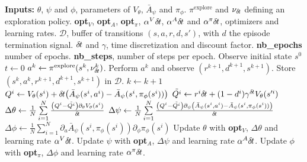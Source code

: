 
\begin{algorithmic}
	\STATE \textbf{Inputs:}
	\STATE $\theta$, $\psi$ and $\phi$, parameters of
	$V_{\theta}$, $\bar{A}_{\psi}$ and $\pi_\phi$.
	\STATE $\pi^{\text{explore}}$ and $\nu_{\delta\hspace{-.1em}t}$ defining an exploration policy.
	\STATE \textbf{opt}$_V$, \textbf{opt}$_A$, \textbf{opt}$_\pi$, $\alpha^V {\delta\hspace{-.1em}t}$, $\alpha^A {\delta\hspace{-.1em}t}$ and $\alpha^\pi{\delta\hspace{-.1em}t}$, optimizers and learning rates.
	\STATE $\mathcal{D}$, buffer of transitions $(s, a, r, d, s')$, with $d$ the episode termination signal.
	\STATE ${\delta\hspace{-.1em}t}$ and $\gamma$, time discretization and discount factor.
	\STATE \textbf{nb\_epochs} number of epochs.
	\STATE \textbf{nb\_steps}, number of steps per epoch.
	\STATE
	\STATE Observe initial state $s^0$
	\STATE $t \gets 0$
	\STATE $a^k \leftarrow \pi^{\text{explore}}(s^k, \nu^k_{\delta\hspace{-.1em}t})$.
	\STATE Perform $a^k$ and observe $(r^{k+1}, d^{k+1}, s^{k+1})$.
	\STATE Store $(s^k, a^k, r^{k+1}, d^{k+1}, s^{k+1})$ in $\mathcal{D}$.
	\STATE $k \gets k + 1$
	\ENDFOR
	\STATE {}
	\STATE $Q^i \gets V_{\theta}(s^i) + {\delta\hspace{-.1em}t}\hspace{-.17em}\left(
	\bar{A}_{\psi}(s^i, a^i) - \bar{A}_{\psi}(s^i, \pi_\phi(s^i))\right)$
	\STATE $\tilde{Q^i} \gets r^i{\delta\hspace{-.1em}t} + (1 - d^i) \gamma^{{\delta\hspace{-.1em}t}} V_{\theta}(s'^i)$
	\STATE $\Delta \theta \gets \frac{1}{N}\sum\limits_{i=1}^N  \frac{\left(Q^i - \tilde{Q^i}\right)\partial_{\theta} V_{\theta}(s^i)}{{\delta\hspace{-.1em}t}}$
	\STATE $\Delta \psi \gets \frac{1}{N}\sum\limits_{i=1}^N \frac{\left(Q^i - \tilde{Q^i}\right)\partial_{\psi} \left(\bar{A}_{\psi}(s^i, a^i) - \bar{A}_{\psi}(s^i, \pi_\phi(s^i))\right) }{{\delta\hspace{-.1em}t}}$
	\STATE $\Delta \phi \gets \frac{1}{N} \sum\limits_{i=1}^N \partial_a \bar{A}_\psi(s^i, \pi_\phi(s^i)) \partial_\phi \pi_\phi(s^i)$
	\STATE Update $\theta$ with \textbf{opt}$_V$, $\Delta \theta$ and learning rate $\alpha^V {\delta\hspace{-.1em}t}$.
	\STATE Update $\psi$ with \textbf{opt}$_A$, $\Delta \psi$ and learning rate $\alpha^A {\delta\hspace{-.1em}t}$.
	\STATE Update $\phi$ with \textbf{opt}$_\pi$, $\Delta \phi$ and learning rate $\alpha^\pi {\delta\hspace{-.1em}t}$.
	\ENDFOR
	\ENDFOR
\end{algorithmic}
